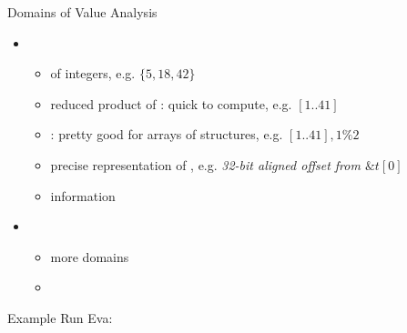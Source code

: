 \begin{frame}{Domains of Value Analysis}

\begin{itemize}
	\item {}
	\smallskip
	\begin{itemize}
		\item {} of integers, e.g. {$\{5, 18, 42\}$}
		\smallskip
		\item reduced product of : quick to compute, e.g. {$[1..41]$}
		\smallskip
		\item {}: pretty good for arrays of structures, e.g. {$[1..41],
			1\%2$}
		\smallskip
		\item precise representation of , e.g. {\textit{32-bit aligned
				offset from $\&t[0]$}}
		\smallskip
		\item {} information
	\end{itemize}
	\medskip
	\item  {}
	\begin{itemize}
		\item more  domains
		\medskip
		\item {}		
	\end{itemize}
	
\end{itemize}

\end{frame}


\begin{frame}[fragile]{Example}
  Run Eva:
  \\[3mm]
  
  \vspace{3mm}
\end{frame}

